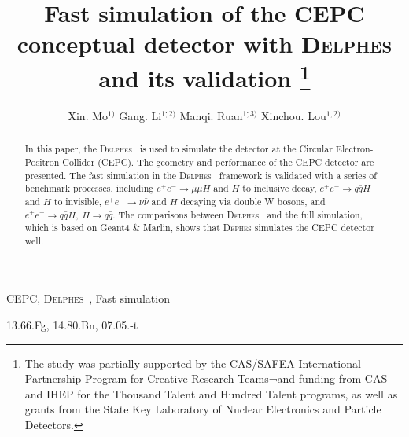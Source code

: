 \documentclass[a4paper,10pt,twoside]{cpc-hepnp}
\begin{document}



\title{Fast simulation of the CEPC conceptual detector with  {\textsc{Delphes}} and its validation 
\thanks{The study was partially supported by the CAS/SAFEA International Partnership Program for Creative Research Teams¬and funding from CAS and IHEP for the Thousand Talent and Hundred Talent programs, as well as grants from the State Key Laboratory of Nuclear Electronics and Particle Detectors.}}

\author{%
      Xin. Mo$^{1)}$%
\quad Gang. Li$^{1;2)}$%
\quad Manqi. Ruan$^{1;3)}$%
\quad Xinchou. Lou$^{1,2)}$%
}
\maketitle


\address{%
$^1$ Institute of High Energy Physics, Chinese Academy of Sciences, Beijing 100049, China\\
$^2$ University of Texas at Dallas, Richardson, TX 75080-3021, USA
}


\begin{abstract}
In this paper, the {\textsc{Delphes}~} is used to simulate the detector at the Circular Electron-Positron Collider (CEPC). The geometry and performance of the CEPC detector are presented. The fast simulation in the {\textsc{Delphes}~} framework is validated with  a series of  benchmark processes, including $e^+e^- \to \mu\mu H$ and $H$ to inclusive decay,  $e^+e^- \to q\bar{q}H$ and $H$ to invisible,  $e^+e^- \to \nu\bar{\nu}$ and $H$ decaying via double W bosons, and $e^+e^- \to q\bar{q}H,~ H \to q\bar{q}$. The comparisons between {\textsc{Delphes}~} and the full simulation, which is based on Geant4 \& Marlin, shows that {\textsc{Dephes}} simulates the CEPC detector well.  
\end{abstract}


\begin{keyword}
CEPC, {\textsc{Delphes}~}, Fast simulation
\end{keyword}

\begin{pacs}
13.66.Fg, 14.80.Bn, 07.05.-t
\end{pacs}
\end{document}
